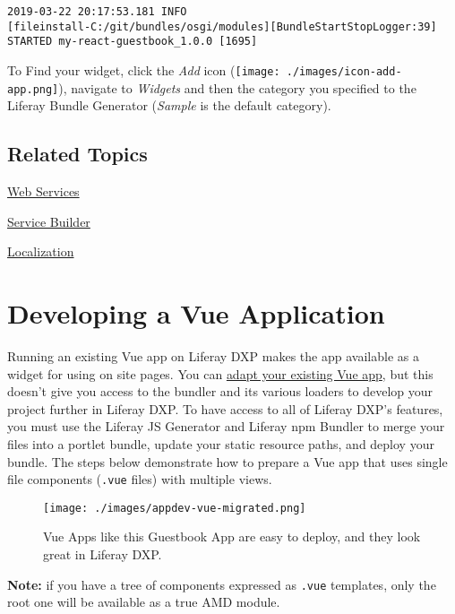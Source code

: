\begin{verbatim}
2019-03-22 20:17:53.181 INFO  
[fileinstall-C:/git/bundles/osgi/modules][BundleStartStopLogger:39] 
STARTED my-react-guestbook_1.0.0 [1695]
\end{verbatim}

To Find your widget, click the \emph{Add} icon
(\texttt{[image: ./images/icon-add-app.png]}), navigate to
\emph{Widgets} and then the category you specified to the Liferay Bundle
Generator (\emph{Sample} is the default category).

\section{Related Topics}\label{related-topics-1}

\href{/docs/7-2/frameworks/-/knowledge_base/f/web-services}{Web
Services}

\href{/docs/7-2/appdev/-/knowledge_base/a/service-builder}{Service
Builder}

\href{/docs/7-2/frameworks/-/knowledge_base/f/localization}{Localization}

\chapter{Developing a Vue
Application}\label{developing-a-vue-application}

Running an existing Vue app on Liferay DXP makes the app available as a
widget for using on site pages. You can
\href{/docs/7-2/reference/-/knowledge_base/r/adapting-existing-apps-to-run-on-product}{adapt
your existing Vue app}, but this doesn't give you access to the bundler
and its various loaders to develop your project further in Liferay DXP.
To have access to all of Liferay DXP's features, you must use the
Liferay JS Generator and Liferay npm Bundler to merge your files into a
portlet bundle, update your static resource paths, and deploy your
bundle. The steps below demonstrate how to prepare a Vue app that uses
single file components (\texttt{.vue} files) with multiple views.

\begin{figure}
\centering
\texttt{[image: ./images/appdev-vue-migrated.png]}
\caption{Vue Apps like this Guestbook App are easy to deploy, and they
look great in Liferay DXP.}
\end{figure}

\noindent\hrulefill

\textbf{Note:} if you have a tree of components expressed as
\texttt{.vue} templates, only the root one will be available as a true
AMD module.

